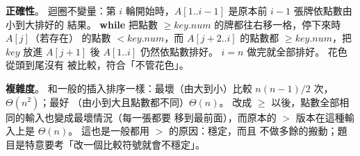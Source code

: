 \begin{pastsoln}
\textbf{正確性}。 迴圈不變量：第 $i$ 輪開始時，$A[1..i-1]$ 是原本前 $i - 1$ 張牌依點數由小到大排好的
結果。 \textbf{while} 把點數 $\ge \mathit{key}.\mathit{num}$ 的牌都往右移一格，停下來時 $A[j]$（若存在）
的點數 $< \mathit{key}.\mathit{num}$，而 $A[j+2..i]$ 的點數都 $\ge \mathit{key}.\mathit{num}$，把
$\mathit{key}$ 放進 $A[j + 1]$ 後 $A[1..i]$ 仍然依點數排好。 $i = n$ 做完就全部排好。 花色從頭到尾沒有
被比較，符合「不管花色」。

\textbf{複雜度}。 和一般的插入排序一樣：最壞（由大到小）比較 $n(n-1)/2$ 次，$\Theta(n^2)$；最好
（由小到大且點數都不同）$\Theta(n)$。 改成 $\ge$ 以後，點數全部相同的輸入也變成最壞情況（每一張都要
移到最前面），而原本的 $>$ 版本在這種輸入上是 $\Theta(n)$。 這也是一般都用 $>$ 的原因：穩定，而且
不做多餘的搬動；題目是特意要考「改一個比較符號就會不穩定」。
\end{pastsoln}
